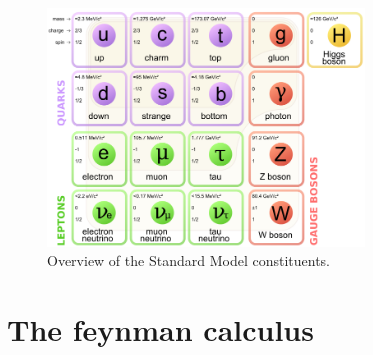 \begin{figure}[h!]
 \begin{center}
\includegraphics[width=0.75\textwidth]{figures/theory/sm.png}
\caption{Overview of the Standard Model constituents.}
  \label{fig:SM}
 \end{center}
\end{figure}

\section{The feynman calculus}\label{subsec:Feynman}
